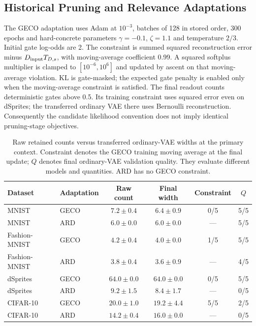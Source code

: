 \documentclass[make,article,submit,pdftex,moreauthors]{Definitions/mdpi}
\begin{document}
\subsection{Historical Pruning and Relevance Adaptations}\label{app:adaptations}
The GECO adaptation uses Adam at $10^{-3}$, batches of 128 in stored
order, 300 epochs and hard-concrete parameters $\gamma=-0.1$,
$\zeta=1.1$ and temperature $2/3$. Initial gate log-odds are 2. The
constraint is summed squared reconstruction error minus
$D_{\rm input}T_{D,s}$, with moving-average coefficient 0.99. A squared
softplus multiplier is clamped to $[10^{-6},10^6]$ and updated by ascent
on that moving-average violation. KL is gate-masked; the expected gate
penalty is enabled only when the moving-average constraint is satisfied.
The final readout counts deterministic gates above 0.5. Its training
constraint uses squared error even on dSprites; the transferred ordinary
VAE there uses Bernoulli reconstruction. Consequently the candidate
likelihood convention does not imply identical pruning-stage objectives.

\begin{table}[H]
\caption{Raw retained counts versus transferred ordinary-VAE widths at the primary context. Constraint denotes the GECO training moving average at the final update; $Q$ denotes final ordinary-VAE validation quality. They evaluate different models and quantities. ARD has no GECO constraint.}\label{tab:pruning}
\footnotesize
\setlength{\tabcolsep}{3.5pt}
\begin{tabular*}{\textwidth}{@{\extracolsep{\fill}}llcccc@{}}
\toprule
Dataset & Adaptation & Raw count & Final width & Constraint & $Q$ \\
\midrule
MNIST & GECO & $7.2 \pm 0.4$ & $6.4 \pm 0.9$ & 0/5 & 5/5 \\
MNIST & ARD & $6.0 \pm 0.0$ & $6.0 \pm 0.0$ & --- & 5/5 \\
Fashion-MNIST & GECO & $4.2 \pm 0.4$ & $4.0 \pm 0.0$ & 1/5 & 5/5 \\
Fashion-MNIST & ARD & $3.8 \pm 0.4$ & $3.6 \pm 0.9$ & --- & 4/5 \\
dSprites & GECO & $64.0 \pm 0.0$ & $64.0 \pm 0.0$ & 0/5 & 5/5 \\
dSprites & ARD & $9.2 \pm 1.5$ & $8.4 \pm 1.7$ & --- & 0/5 \\
CIFAR-10 & GECO & $20.0 \pm 1.0$ & $19.2 \pm 4.4$ & 5/5 & 2/5 \\
CIFAR-10 & ARD & $14.2 \pm 0.4$ & $16.0 \pm 0.0$ & --- & 0/5 \\
\bottomrule
\end{tabular*}
\end{table}
\end{document}
